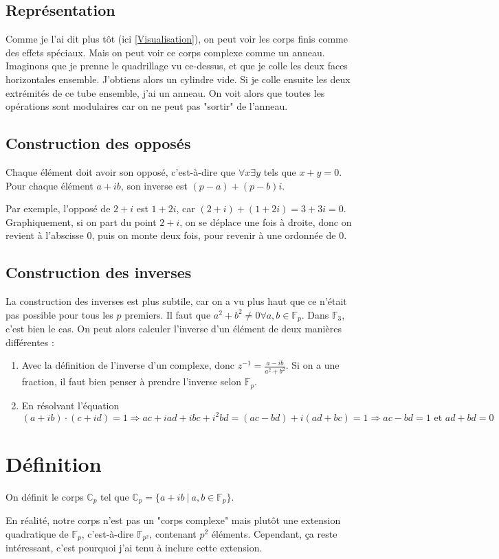\documentclass[10pt,a4paper]{book}
\newcommand{\F}{\mathbb{F}}
\newcommand{\C}{\mathbb{C}}
\begin{document}
\subsection{Représentation}
Comme je l'ai dit plus tôt (ici \ref{Visualisation}), on peut voir les corps finis comme des effets spéciaux. Mais on peut voir ce corps complexe comme un anneau. Imaginons que je prenne le quadrillage vu ce-dessus, et que je colle les deux faces horizontales ensemble. J'obtiens alors un cylindre vide. Si je colle ensuite les deux extrémités de ce tube ensemble, j'ai un anneau. On voit alors que toutes les opérations sont modulaires car on ne peut pas "sortir" de l'anneau.

\subsection{Construction des opposés}
Chaque élément doit avoir son opposé, c'est-à-dire que $\forall x\exists y$ tels que $x+y=0$. Pour chaque élément $a+ib$, son inverse est $(p-a)+(p-b)i$. \par 
Par exemple, l'opposé de $2+i$ est $1+2i$, car $(2+i)+(1+2i)=3+3i=0$. Graphiquement, si on part du point $2+i$, on se déplace une fois à droite, donc on revient à l'abscisse 0, puis on monte deux fois, pour revenir à une ordonnée de 0.

\subsection{Construction des inverses}
La construction des inverses est plus subtile, car on a vu plus haut que ce n'était pas possible pour tous les $p$ premiers. Il faut que $a^2+b^2\neq0\forall a,b\in\F_p$. Dans $\F_3$, c'est bien le cas. On peut alors calculer l'inverse d'un élément de deux manières différentes :
\begin{enumerate}
\item Avec la définition de l'inverse d'un complexe, donc $z^{-1}=\frac{a-ib}{a^2+b^2}$. Si on a une fraction, il faut bien penser à prendre l'inverse selon $\F_p$.
\item En résolvant l'équation $(a+ib)\cdot(c+id)=1\Rightarrow ac+iad+ibc+i^2bd=(ac-bd)+i(ad+bc)=1\Rightarrow ac-bd=1\text{ et }ad+bd=0$
\end{enumerate}

\section{Définition}
On définit le corps $\C_p$ tel que $\C_p = \{a+ib\ |\ a,b\in\F_p\}$. \par 
En réalité, notre corps n'est pas un "corps complexe" mais plutôt une extension quadratique de $\F_p$, c'est-à-dire $\F_{p^2}$, contenant $p^2$ éléments. Cependant, ça reste intéressant, c'est pourquoi j'ai tenu à inclure cette extension.
\end{document}
